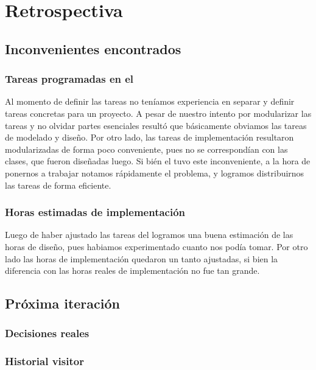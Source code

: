 \section{Retrospectiva}
  \subsection{Inconvenientes encontrados}
    \subsubsection{Tareas programadas en el \sprintback{}}
      Al momento de definir las tareas no ten\'iamos experiencia en separar y definir
      tareas concretas para un proyecto. A pesar de nuestro intento por modularizar
      las tareas y no olvidar partes esenciales result\'o que b\'asicamente obviamos
      las tareas de modelado y dise\~no. Por otro lado, las tareas de implementaci\'on
      resultaron modularizadas de forma poco conveniente, pues no se correspond\'ian
      con las clases, que fueron dise\~nadas luego. Si bi\'en el \sprintback{} tuvo
      este inconveniente, a la hora de ponernos a trabajar notamos r\'apidamente
      el problema, y logramos distribuirnos las tareas de forma eficiente.
    \subsubsection{Horas estimadas de implementaci\'on}
      Luego de haber ajustado las tareas del \sprintback{} logramos una buena
      estimaci\'on de las horas de dise\~no, pues habiamos experimentado cuanto
      nos pod\'ia tomar. Por otro lado las horas de implementaci\'on quedaron un tanto
      ajustadas, si bien la diferencia con las horas reales de implementaci\'on no
      fue tan grande.

    \subsection{Pr\'oxima iteraci\'on}

      \subsubsection{Decisiones reales}

      \subsubsection{Historial visitor}

